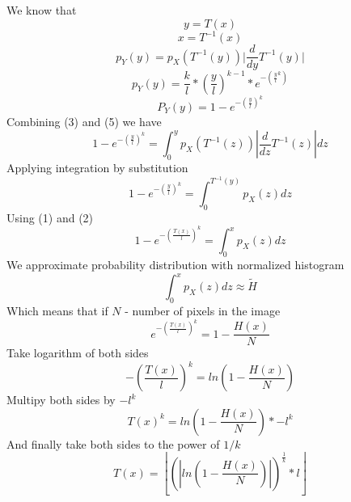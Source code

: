\documentclass[10pt,a4paper]{article}
\begin{document}
 We know that
 \begin{equation}y=T(x)\end{equation}      
 \begin{equation}x=T^{-1}(x)\end{equation}
 \begin{equation}p_Y(y)=p_X(T^{-1}(y)) \lvert \frac{d}{dy}T^{-1}(y) \rvert\end{equation}
 \begin{equation}p_Y(y)=\frac{k}{l}*(\frac{y}{l})^{k-1}*e^{-(\frac{y}{l}^k)}\end{equation}
 \begin{equation}P_Y(y)=1-e^{-(\frac{y}{l})^k}\end{equation}
 Combining (3) and (5) we have
 \begin{equation}1-e^{-(\frac{y}{l})^k}=\int_0^y p_X(T^{-1}(z)) \left| \frac{d}{dz}T^{-1}(z)\right|dz\end{equation}
 Applying integration by substitution
 \begin{equation}1-e^{-(\frac{y}{l})^k}=\int_0^{T^{-1}(y)} p_X(z)dz\end{equation}
 Using (1) and (2)
 \begin{equation}1-e^{-(\frac{T(x)}{l})^k}=\int_0^x p_X(z)dz\end{equation}
 We approximate probability distribution with normalized histogram
 \begin{equation}\int_0^x p_X(z)dz \approx \tilde{H}\end{equation}
 Which means that if $N$ - number of pixels in the image
 \begin{equation}e^{-(\frac{T(x)}{l})^k}=1-\frac{H(x)}{N}\end{equation}
 Take logarithm of both sides
 \begin{equation}-\left(\frac{T(x)}{l}\right)^k=ln\left(1-\frac{H(x)}{N}\right)\end{equation}
 Multipy both sides by $-l^k$
 \begin{equation}T(x)^k=ln\left(1-\frac{H(x)}{N}\right)*-l^k\end{equation}
 And finally take both sides to the power of $1/k$
 \begin{equation}T(x)=\left\lfloor\left(\left|ln\left(1-\frac{H(x)}{N}\right)\right|\right)^{\frac{1}{k}}*l\right\rfloor\end{equation}
\end{document}
